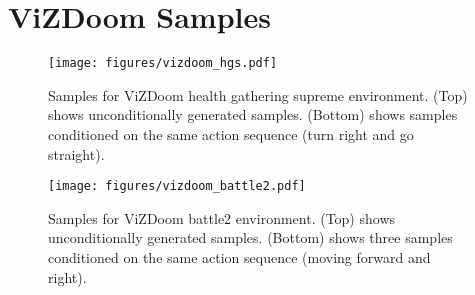 \documentclass{article}
\begin{document}
\section{ViZDoom Samples}
\label{appendix:vizdoom_samples}
\begin{figure}[H]
    \centering
    \texttt{[image: figures/vizdoom\_hgs.pdf]}
    \caption{Samples for ViZDoom health gathering supreme environment. (Top) shows unconditionally generated samples. (Bottom) shows samples conditioned on the same action sequence (turn right and go straight).}
    \label{fig:hgs}
\end{figure}

\begin{figure}[H]
    \centering
    \texttt{[image: figures/vizdoom\_battle2.pdf]}
    \caption{Samples for ViZDoom battle2 environment. (Top) shows unconditionally generated samples. (Bottom) shows three samples conditioned on the same action sequence (moving forward and right).}
    \label{fig:battle2}
\end{figure} 
\end{document}
